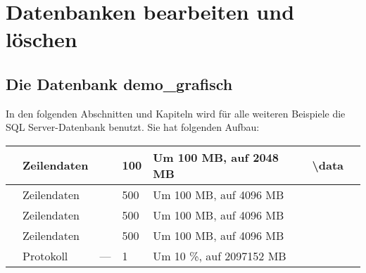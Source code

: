     \section{Datenbanken bearbeiten und löschen}
      \subsection{Die Datenbank demo\_grafisch}
        In den folgenden Abschnitten und Kapiteln wird für alle weiteren
        Beispiele die SQL Server-Datenbank  benutzt.
        Sie hat folgenden Aufbau:
        \begin{center}
          \begin{scriptsize}
            \tablehead{}
            \tabletail {
            }
            \tablelasttail {
            }
            \begin{supertabular}{llll>{\centering}p{2cm}ll}
               & Zeilendaten &  & 100 & Um 100 MB,
              auf 2048 MB & \textbackslash data & 
              \\
              \hline
               & Zeilendaten &  & 500 & Um 100 MB, auf 4096
              MB &  &
               \\
              \hline
               & Zeilendaten &  & 500 &
              Um 100 MB, auf 4096 MB &  &
               \\
              \hline
               & Zeilendaten &  & 500 &
              Um 100 MB, auf 4096 MB &  &
               \\
              \hline
               & Protokoll & --- & 1 & Um 10 \%, auf
              2097152 MB &  &
               \\
            \end{supertabular}
          \end{scriptsize}
        \end{center}
